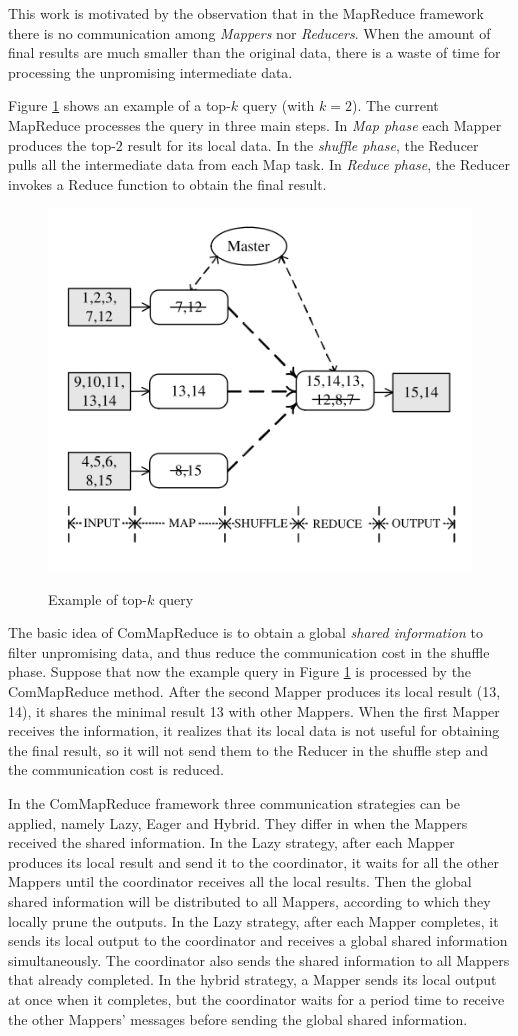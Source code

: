 \documentclass[paper=a4, fontsize=18pt]{article} %
\numberwithin{equation}{section} %
\numberwithin{figure}{section} %
\numberwithin{table}{section} %
\begin{document}
This work is motivated by the observation that in the MapReduce framework there is no communication among \emph{Mappers} nor \emph{Reducers}. When the amount of final results are much smaller than the original data, there is a waste of time for processing the unpromising intermediate data.

Figure \ref{fig:commapreduce} shows an example of a top-$k$ query (with $k=2$). The current MapReduce processes the query in three main steps. In \emph{Map phase} each Mapper produces the top-$2$ result for its local data. In the \emph{shuffle phase}, the Reducer pulls all the intermediate data from each Map task. In \emph{Reduce phase}, the Reducer invokes a Reduce function to obtain the final result.

\begin{figure}[h]
  \centering
  \includegraphics[width=.5\linewidth]{7_18_commapreduce.png}\\
  \caption{Example of top-$k$ query}\label{fig:commapreduce}
\end{figure}


The basic idea of ComMapReduce is to obtain a global \emph{shared information} to filter unpromising data, and thus reduce the communication cost in the shuffle phase. Suppose that now the example query in Figure \ref{fig:commapreduce} is processed by the ComMapReduce method. After the second Mapper produces its local result (13, 14), it shares the minimal result 13 with other Mappers. When the first Mapper receives the information, it realizes that its local data is not useful for obtaining the final result, so it will not send them to the Reducer in the shuffle step and the communication cost is reduced.

In the ComMapReduce framework three communication strategies can be applied, namely Lazy, Eager and Hybrid. They differ in when the Mappers received the shared information. In the Lazy strategy, after each Mapper produces its local result and send it to the coordinator, it waits for all the other Mappers until the coordinator receives all the local results. Then the global shared information will be distributed to all Mappers, according to which they locally prune the outputs. In the Lazy strategy, after each Mapper completes, it sends its local output to the coordinator and receives a global shared information simultaneously. The coordinator also sends the shared information to all Mappers that already completed. In the hybrid strategy, a Mapper sends its local output at once when it completes, but the coordinator waits for a period time to receive the other Mappers' messages before sending the global shared information.
\end{document}

